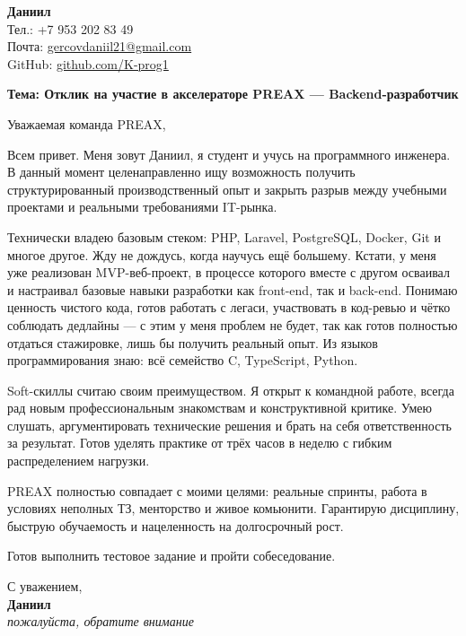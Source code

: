 \documentclass[11pt,a4paper]{article}
\begin{document}
\begin{flushright}

\textbf{Даниил} \\
Тел.: +7 953 202 83 49 \\
Почта: \href{mailto:gercovdaniil21@gmail.com}{gercovdaniil21@gmail.com} \\
GitHub: \href{https://github.com/K-prog1}{github.com/K-prog1}
\end{flushright}

\vspace{1cm}

\textbf{Тема: Отклик на участие в акселераторе PREAX — Backend-разработчик}

\vspace{0.5cm}

Уважаемая команда PREAX,

Всем привет. Меня зовут Даниил, я студент и учусь на программного инженера. В данный момент целенаправленно ищу возможность получить структурированный производственный опыт и закрыть разрыв между учебными проектами и реальными требованиями IT-рынка.

Технически владею базовым стеком: PHP, Laravel, PostgreSQL, Docker, Git и многое другое. Жду не дождусь, когда научусь ещё большему. Кстати, у меня уже реализован MVP-веб-проект, в процессе которого вместе с другом осваивал и настраивал базовые навыки разработки как front-end, так и back-end. Понимаю ценность чистого кода, готов работать с легаси, участвовать в код-ревью и чётко соблюдать дедлайны — с этим у меня проблем не будет, так как готов полностью отдаться стажировке, лишь бы получить реальный опыт. Из языков программирования знаю: всё семейство C, TypeScript, Python.

Soft-скиллы считаю своим преимуществом. Я открыт к командной работе, всегда рад новым профессиональным знакомствам и конструктивной критике. Умею слушать, аргументировать технические решения и брать на себя ответственность за результат. Готов уделять практике от трёх часов в неделю с гибким распределением нагрузки.

PREAX полностью совпадает с моими целями: реальные спринты, работа в условиях неполных ТЗ, менторство и живое комьюнити. Гарантирую дисциплину, быструю обучаемость и нацеленность на долгосрочный рост.

Готов выполнить тестовое задание и пройти собеседование.

С уважением, \\
\textbf{Даниил} \\
\textit{пожалуйста, обратите внимание}
\end{document}
